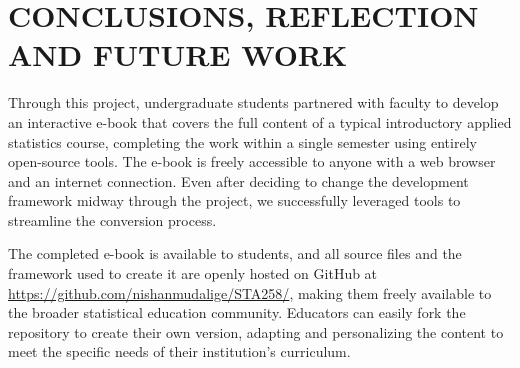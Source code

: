 \documentclass[11pt]{article}
\begin{document}




\section{CONCLUSIONS, REFLECTION AND FUTURE WORK}

Through this project, undergraduate students partnered with faculty to develop an interactive e-book that covers the full content of a typical introductory applied statistics course, completing the work within a single semester using entirely open-source tools. The e-book is freely accessible to anyone with a web browser and an internet connection. Even after deciding to change the development framework midway through the project, we successfully leveraged tools to streamline the conversion process.

The completed e-book is available to students, and all source files and the framework used to create it are openly hosted on GitHub at \href{https://github.com/nishanmudalige/STA258/}{https://github.com/nishanmudalige/STA258/}, making them freely available to the broader statistical education community. Educators can easily fork the repository to create their own version, adapting and personalizing the content to meet the specific needs of their institution’s curriculum.
\end{document}
